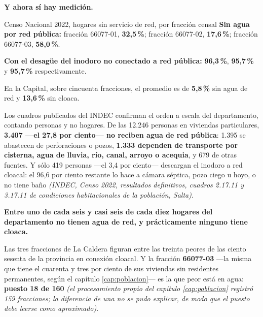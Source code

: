 \textbf{Y ahora sí hay medición.}

\begin{ficha}{Censo Nacional 2022, hogares sin servicio de red, por fracción censal}
\textbf{Sin agua por red pública:} fracción 66077-01, \textbf{32,5\,\%}; fracción 66077-02,
\textbf{17,6\,\%}; fracción 66077-03, \textbf{58,0\,\%}.

\textbf{Con el desagüe del inodoro no conectado a red pública:} \textbf{96,3\,\%}, \textbf{95,7\,\%}
y \textbf{95,7\,\%} respectivamente.

En la Capital, sobre cincuenta fracciones, el promedio es de \textbf{5,8\,\%} sin agua de red y
\textbf{13,6\,\%} sin cloaca.
\end{ficha}

Los cuadros publicados del INDEC confirman el orden a escala del departamento, contando personas y no hogares. De las 12.246 personas en viviendas particulares, \textbf{3.407 ---el 27,8 por ciento--- no reciben agua de red pública}: 1.395 se abastecen de perforaciones o pozos, \textbf{1.333 dependen de transporte por cisterna, agua de lluvia, río, canal, arroyo o acequia}, y 679 de otras fuentes. Y sólo 419 personas ---el 3,4 por ciento--- descargan el inodoro a red cloacal: el 96,6 por ciento restante lo hace a cámara séptica, pozo ciego u hoyo, o no tiene baño \textit{(INDEC, Censo 2022, resultados definitivos, cuadros 2.17.11 y 3.17.11 de condiciones habitacionales de la población, Salta)}.


\textbf{Entre uno de cada seis y casi seis de cada diez hogares del departamento no tienen agua
de red, y prácticamente ninguno tiene cloaca.}

Las tres fracciones de La Caldera figuran entre las treinta peores de las ciento sesenta de la
provincia en conexión cloacal. Y la fracción \textbf{66077-03} ---la misma que tiene el
cuarenta y tres por ciento de sus viviendas sin residentes permanentes, según el capítulo
\ref{cap:poblacion}--- es la que peor está en agua: \textbf{puesto 18 de 160} \textit{(el procesamiento propio del capítulo \ref{cap:poblacion} registró 159 fracciones; la diferencia de una no se pudo explicar, de modo que el puesto debe leerse como aproximado)}.


